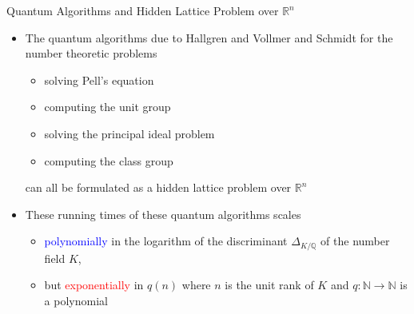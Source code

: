\documentclass{beamer}
\newcommand{\Q}{\mathbb{Q}}
\newcommand{\R}{\mathbb{R}}
\newcommand{\Z}{\mathbb{Z}}
\newcommand{\cO}{\mathcal{O}}
\renewcommand{\>}{\rangle}
\newcommand{\<}{\langle}
\begin{document}


%


\begin{frame}{Quantum Algorithms and Hidden Lattice Problem over $\R^n$}

\begin{itemize}
\item The quantum algorithms due to {\sc Hallgren} and {\sc Vollmer and Schmidt}  for the number theoretic problems

\begin{itemize}
\item solving Pell's equation
\medskip
\item computing the unit group
\medskip
\item solving the principal ideal problem
\medskip
\item computing the class group 
\end{itemize}
can all be formulated as a hidden lattice problem over $\R^n$

\medskip
\item These running times of these quantum algorithms scales

\begin{itemize}
\item \textcolor{blue}{polynomially} in the logarithm of the discriminant $\Delta_{K/\Q}$ of the number field $K$, 

\medskip
\item but \textcolor{red}{exponentially} in $q(n)$ where $n$ is the unit rank of $K$ and $q : \mathbb{N} \rightarrow \mathbb{N}$ is a polynomial  
\end{itemize}
\end{itemize}
\end{frame}

\end{document}
